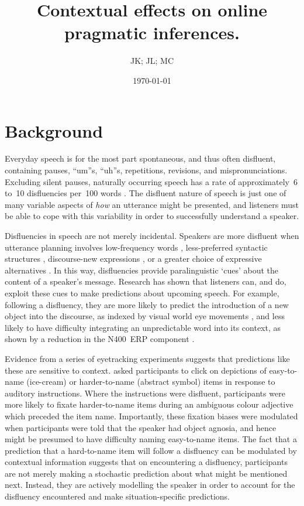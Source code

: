 \documentclass[a4paper,man,natbib]{apa6}
\title{Contextual effects on online pragmatic inferences.}
\author{JK; JL; MC}
\date{\today}
\newcommand*{\spex}[1]{``{#1}''} %
\begin{document}
\maketitle


\section{Background}
Everyday speech is for the most part spontaneous, and thus often disfluent, containing pauses, \spex{um}s, \spex{uh}s, repetitions, revisions, and mispronunciations.
Excluding silent pauses, naturally occurring speech has a rate of approximately~6 to~10 disfluencies per~100 words \citep{Bortfeld2001,FoxTree1995}.
The disfluent nature of speech is just one of many variable aspects of \emph{how} an utterance might be presented, and listeners must be able to cope with this variability in order to successfully understand a speaker.

Disfluencies in speech are not merely incidental.  Speakers are more disfluent when utterance planning involves low-frequency words \citep{Beattie1979}, less-preferred syntactic structures \citep{Cook2009}, discourse-new expressions \citep{arnold2000heaviness}, or a greater choice of expressive alternatives \citep{Schachter1991}.
In this way, disfluencies provide paralinguistic `cues' about the content of a speaker's message.
Research has shown that listeners can, and do, exploit these cues to make predictions about upcoming speech.
For example, following a disfluency, they are more likely to predict the introduction of a new object into the discourse, as indexed by visual world eye movements \citep{Arnold2004}, and less likely to have difficulty integrating an unpredictable word into its context, as shown by a reduction in the N400~ERP component \citep{Corley2007}.

Evidence from a series of eyetracking experiments suggests that predictions like these are sensitive to context.
\citet{Arnold2007} asked participants to click on depictions of easy-to-name (ice-cream) or harder-to-name (abstract symbol) items in response to auditory instructions.
Where the instructions were disfluent, participants were more likely to fixate harder-to-name items during an ambiguous colour adjective which preceded the item name.
Importantly, these fixation biases were modulated when participants were told that the speaker had object agnosia, and hence might be presumed to have difficulty naming easy-to-name items.
The fact that a prediction that a hard-to-name item will follow a disfluency can be modulated by contextual information suggests that on encountering a disfluency, participants are not merely making a stochastic prediction about what might be mentioned next.
Instead, they are actively modelling the speaker in order to account for the disfluency encountered and make situation-specific predictions.
\end{document}
